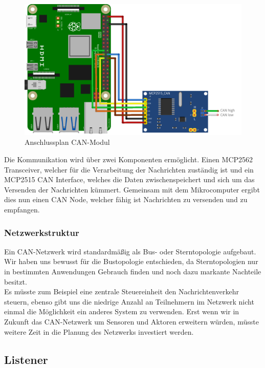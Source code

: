 \begin{figure}[H]
	\begin{center}
		\includegraphics[scale=0.9]{figures/hcis/can_module.png}
		\caption{Anschlussplan CAN-Modul}
	\end{center}
\end{figure}

Die Kommunikation wird über zwei Komponenten ermöglicht. Einen MCP2562 Transceiver, welcher für die Verarbeitung der Nachrichten zuständig ist und ein MCP2515 CAN Interface, welches die Daten zwischenspeichert und sich um das Versenden der Nachrichten kümmert. Gemeinsam mit dem Mikrocomputer ergibt dies nun einen CAN Node, welcher fähig ist Nachrichten zu versenden und zu empfangen.

\subsubsection{Netzwerkstruktur}

Ein CAN-Netzwerk wird standardmäßig als Bus- oder Sterntopologie aufgebaut. Wir haben uns bewusst für die Bustopologie entschieden, da Sterntopologien nur in bestimmten Anwendungen Gebrauch finden und noch dazu markante Nachteile besitzt.\\ Es müsste zum Beispiel eine zentrale Steuereinheit den Nachrichtenverkehr steuern, ebenso gibt uns die niedrige Anzahl an Teilnehmern im Netzwerk nicht einmal die Möglichkeit ein anderes System zu verwenden. Erst wenn wir in Zukunft das CAN-Netzwerk um Sensoren und Aktoren erweitern würden, müsste weitere Zeit in die Planung des Netzwerks investiert werden. 

\newpage

\subsection{Listener}

